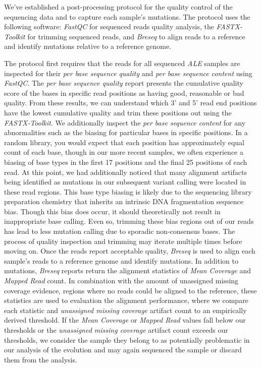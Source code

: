 \documentclass[12pt,final,masters,chapterheads]{ucsd}  %
\begin{document}
We've established a post-processing protocol for the quality control of the sequencing data and to capture each sample's mutations. The protocol uses the following software: \textit{FastQC} \cite{Andrew:2010:Online} for sequenced reads quality analysis, the \textit{FASTX-Toolkit} \cite{FASTX-Toolkit} for trimming sequenced reads, and \textit{Breseq} \cite{breseq_paper} to align reads to a reference and identify mutations relative to a reference genome.

The protocol first requires that the reads for all sequenced \textit{ALE} samples are inspected for their \textit{per base sequence quality} and \textit{per base sequence content} using \textit{FastQC}. The \textit{per base sequence quality} report presents the cumulative quality score of the bases in specific read positions as having good, reasonable or bad quality. From these results, we can understand which 3' and 5' read end positions have the lowest cumulative quality and trim these positions out using the \textit{FASTX-Toolkit}. We additionally inspect the \textit{per base sequence content} for any abnormalities such as the biasing for particular bases in specific positions. In a random library, you would expect that each position has approximately equal count of each base, though in our more recent samples, we often experience a biasing of base types in the first 17 positions and the final 25 positions of each read. At this point, we had additionally noticed that many alignment artifacts being identified as mutations in our subsequent variant calling were located in these read regions. This base type biasing is likely due to the sequencing library preparation chemistry that inherits an intrinsic DNA fragmentation sequence bias. Though this bias does occur, it should theoretically not result in inappropriate base calling. Even so, trimming these bias regions out of our reads has lead to less mutation calling due to sporadic non-consensus bases. The process of quality inspection and trimming may iterate multiple times before moving on. Once the reads report acceptable quality, \textit{Breseq} is used to align each sample's reads to a reference genome and identify mutations. In addition to mutations, \textit{Breseq} reports return the alignment statistics of \textit{Mean Coverage} and \textit{Mapped Read} count. In combination with the amount of unassigned missing coverage evidence, regions where no reads could be aligned to the reference, these statistics are used to evaluation the alignment performance, where we compare each statistic and \textit{unassigned missing coverage} artifact count to an empirically derived threshold. If the \textit{Mean Coverage} or \textit{Mapped Read} values fall below our thresholds or the \textit{unassigned missing coverage} artifact count exceeds our thresholds, we consider the sample they belong to as potentially problematic in our analysis of the evolution and may again sequenced the sample or discard them from the analysis.
\end{document}
